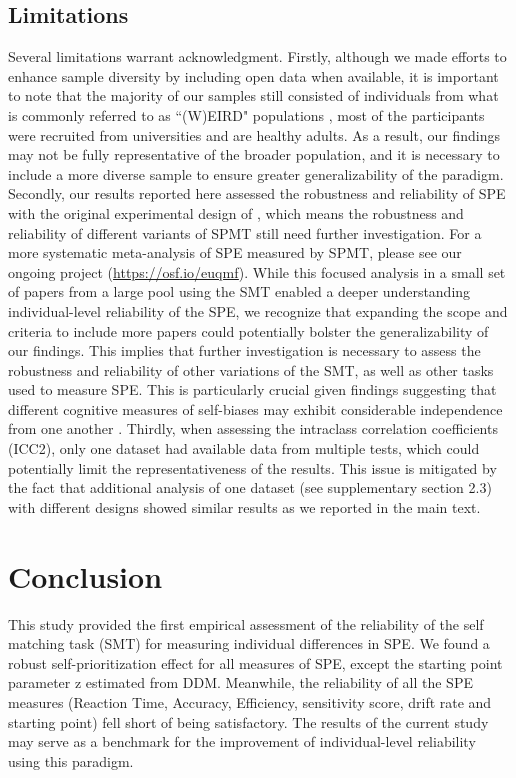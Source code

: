\documentclass[sn-apa]{sn-jnl}%
\theoremstyle{thmstyleone}%
\theoremstyle{thmstyletwo}%
\theoremstyle{thmstylethree}%
\begin{document}
\subsection{Limitations}\label{subsec:lim}
Several limitations warrant acknowledgment. Firstly, although we made efforts to enhance sample diversity by including open data when available, it is important to note that the majority of our samples still consisted of individuals from what is commonly referred to as ``(W)EIRD" populations \parencite{rad2018toward,yue2023weird}, most of the participants were recruited from universities and are healthy adults. As a result, our findings may not be fully representative of the broader population, and it is necessary to include a more diverse sample to ensure greater generalizability of the paradigm. Secondly, our results reported here assessed the robustness and reliability of SPE with the original experimental design of \textcite{sui2012perceptual}, which means the robustness and reliability of different variants of SPMT still need further investigation. For a more systematic meta-analysis of SPE measured by SPMT, please see our ongoing project (\url{https://osf.io/euqmf}). While this focused analysis in a small set of papers from a large pool using the SMT enabled a deeper understanding individual-level reliability of the SPE, we recognize that expanding the scope and criteria to include more papers could potentially bolster the generalizability of our findings. This implies that further investigation is necessary to assess the robustness and reliability of other variations of the SMT, as well as other tasks used to measure SPE. This is particularly crucial given findings suggesting that different cognitive measures of self-biases may exhibit considerable independence from one another \parencite{nijhof2020no}. Thirdly, when assessing the intraclass correlation coefficients (ICC2), only one dataset had available data from multiple tests, which could potentially limit the representativeness of the results. This issue is mitigated by the fact that additional analysis of one dataset (see supplementary section 2.3) with different designs showed similar results as we reported in the main text. 

\section{Conclusion}\label{sec13}

This study provided the first empirical assessment of the reliability of the self matching task (SMT) for measuring individual differences in SPE. We found a robust self-prioritization effect for all measures of SPE, except the starting point parameter z estimated from DDM. Meanwhile, the reliability of all the SPE measures (Reaction Time, Accuracy, Efficiency, sensitivity score, drift rate and starting point) fell short of being satisfactory. The results of the current study may serve as a benchmark for the improvement of individual-level reliability using this paradigm. 
\end{document}
